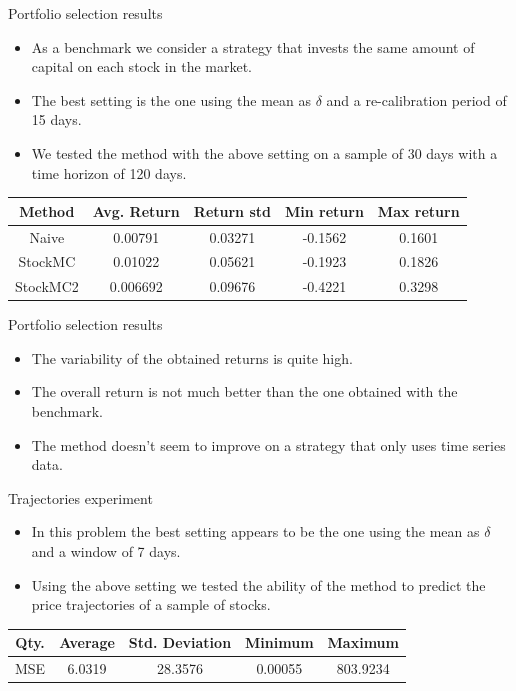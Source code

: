 \documentclass{beamer}
\begin{document}
		\begin{frame}{Portfolio selection results}
		\begin{itemize}
			\item As a benchmark we consider a strategy that invests the same amount of capital on each stock in the market.
			\item The best setting is the one using the mean as $\delta$ and a re-calibration period of 15 days.
			\item We tested the method with the above setting on a sample of 30 days with a time horizon of 120 days.
		\end{itemize}
			\begin{center}
				\begin{tabular}{|c|c|c|c|c|}
					\hline
					Method & Avg. Return & Return std & Min return & Max return\\
					\hline
					\hline
					Naive & 0.00791 & 0.03271 & -0.1562 & 0.1601\\
					\hline
					StockMC & 0.01022 & 0.05621 & -0.1923 & 0.1826\\
					\hline
					StockMC2 & 0.006692 & 0.09676 & -0.4221 & 0.3298\\
					\hline
				\end{tabular}
			\end{center}
		\end{frame}
	
		\begin{frame}{Portfolio selection results}
		\begin{itemize}
			\item The variability of the obtained returns is quite high.
			\item The overall return is not much better than the one obtained with the benchmark.
			\item The method doesn't seem to improve on a strategy that only uses time series data.
		\end{itemize}
		\end{frame}
	
		\begin{frame}{Trajectories experiment}
		\begin{itemize}
			\item In this problem the best setting appears to be the one using the mean as $\delta$ and a window of 7 days.
			\item Using the above setting we tested the ability of the method to predict the price trajectories of a sample of stocks.
		\end{itemize}	
			 \begin{center}
			 	\begin{tabular}{|c|c|c|c|c|}
			 		\hline
			 		Qty. & Average & Std. Deviation & Minimum & Maximum\\
			 		\hline
			 		\hline
			 		MSE & 6.0319   & 28.3576        & 0.00055 & 803.9234\\
			 		\hline
			 	\end{tabular}
			 \end{center}
		\end{frame}	
	
\end{document}
